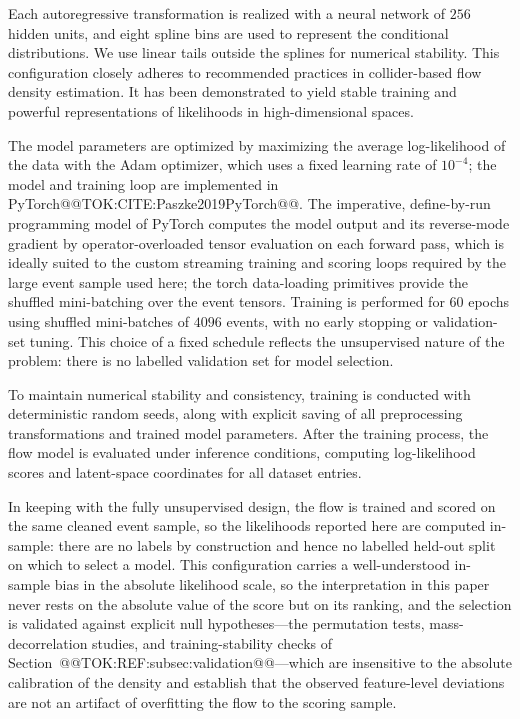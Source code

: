 \documentclass[11pt]{article}
\begin{document}
Each autoregressive transformation is realized with a neural network of $256$ hidden units, and eight spline bins are used to represent the conditional distributions. We use linear tails outside the splines for numerical stability. This configuration closely adheres to recommended practices in collider-based flow density estimation. It has been demonstrated to yield stable training and powerful representations of likelihoods in high-dimensional spaces.

The model parameters are optimized by maximizing the average log-likelihood of the data with the Adam optimizer, which uses a fixed learning rate of $10^{-4}$; the model and training loop are implemented in PyTorch@@TOK:CITE:Paszke2019PyTorch@@. The imperative, define-by-run programming model of PyTorch computes the model output and its reverse-mode gradient by operator-overloaded tensor evaluation on each forward pass, which is ideally suited to the custom streaming training and scoring loops required by the large event sample used here; the torch data-loading primitives provide the shuffled mini-batching over the event tensors. Training is performed for $60$ epochs using shuffled mini-batches of $4096$ events, with no early stopping or validation-set tuning. This choice of a fixed schedule reflects the unsupervised nature of the problem: there is no labelled validation set for model selection.

To maintain numerical stability and consistency, training is conducted with deterministic random seeds, along with explicit saving of all preprocessing transformations and trained model parameters. After the training process, the flow model is evaluated under inference conditions, computing log-likelihood scores and latent-space coordinates for all dataset entries.

In keeping with the fully unsupervised design, the flow is trained and scored on the same cleaned event sample, so the likelihoods reported here are computed in-sample: there are no labels by construction and hence no labelled held-out split on which to select a model. This configuration carries a well-understood in-sample bias in the absolute likelihood scale, so the interpretation in this paper never rests on the absolute value of the score but on its ranking, and the selection is validated against explicit null hypotheses---the permutation tests, mass-decorrelation studies, and training-stability checks of Section~@@TOK:REF:subsec:validation@@---which are insensitive to the absolute calibration of the density and establish that the observed feature-level deviations are not an artifact of overfitting the flow to the scoring sample.
\end{document}
